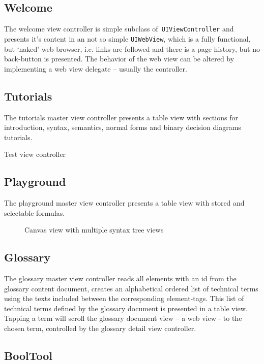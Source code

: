 \subsection{Welcome}

The welcome view controller is simple subclass of\verb+ UIViewController+ and presents it's content in an not so simple \verb+UIWebView+,
which is a fully functional, but ‘naked’ web-browser, i.e. links are followed and there is a page history, but no back-button is presented.
The behavior of the web view can be altered by implementing a web view delegate – usually the controller.

\subsection{Tutorials}

The tutorials master view controller presents a table view with 
sections for introduction, syntax, semantics, normal forms and binary decision diagrams tutorials.

Test view controller 

\subsection{Playground}

The playground master view controller presents a table view with stored and selectable formulas.

\begin{figure}[htbp]
\begin{center}
\caption{Canvas view with multiple syntax tree views}
\label{fig:TreeView}
\end{center}
\end{figure}

\subsection{Glossary}

The glossary master view controller reads all elements with an id from the glossary content document,
creates an alphabetical ordered list of technical terms using the texts included between the corresponding element-tags.
This list of technical terms defined by the glossary document is presented in a table view.
Tapping a term will scroll the glossary document view – a web view - to the chosen term, 
controlled by the glossary detail view controller.

\subsection{BoolTool}


